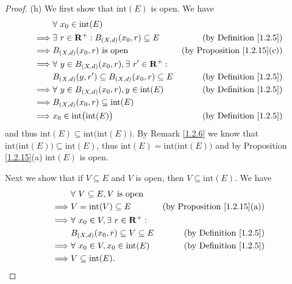 \begin{proof}{(h)}
    We first show that \(\text{int}(E)\) is open.
    We have
    \begin{align*}
                 & \forall\ x_0 \in \text{int}(E)                                                                              \\
        \implies & \exists\ r \in \mathbf{R}^+ : B_{(X, d)}(x_0, r) \subseteq E      & \text{(by Definition \ref{1.2.5})}      \\
        \implies & B_{(X, d)}(x_0, r) \text{ is open}                                & \text{(by Proposition \ref{1.2.15}(c))} \\
        \implies & \forall\ y \in B_{(X, d)}(x_0, r), \exists\ r' \in \mathbf{R}^+ :                                           \\
                 & B_{(X, d)}(y, r') \subseteq B_{(X, d)}(x_0, r) \subseteq E        & \text{(by Definition \ref{1.2.5})}      \\
        \implies & \forall\ y \in B_{(X, d)}(x_0, r), y \in \text{int}(E)            & \text{(by Definition \ref{1.2.5})}      \\
        \implies & B_{(X, d)}(x_0, r) \subseteq \text{int}(E)                                                                  \\
        \implies & x_0 \in \text{int}\big(\text{int}(E)\big)                         & \text{(by Definition \ref{1.2.5})}
    \end{align*}
    and thus \(\text{int}(E) \subseteq \text{int}\big(\text{int}(E)\big)\).
    By Remark \ref{1.2.6} we know that \(\text{int}\big(\text{int}(E)\big) \subseteq \text{int}(E)\), thus \(\text{int}(E) = \text{int}\big(\text{int}(E)\big)\) and by Proposition \ref{1.2.15}(a) \(\text{int}(E)\) is open.

    Next we show that if \(V \subseteq E\) and \(V\) is open, then \(V \subseteq \text{int}(E)\).
    We have
    \begin{align*}
                 & \forall\ V \subseteq E, V \text{ is open}                                                   \\
        \implies & V = \text{int}(V) \subseteq E                     & \text{(by Proposition \ref{1.2.15}(a))} \\
        \implies & \forall\ x_0 \in V, \exists\ r \in \mathbf{R}^+ :                                           \\
                 & B_{(X, d)}(x_0, r) \subseteq V \subseteq E        & \text{(by Definition \ref{1.2.5})}      \\
        \implies & \forall\ x_0 \in V, x_0 \in \text{int}(E)         & \text{(by Definition \ref{1.2.5})}      \\
        \implies & V \subseteq \text{int}(E).
    \end{align*}


\end{proof}
